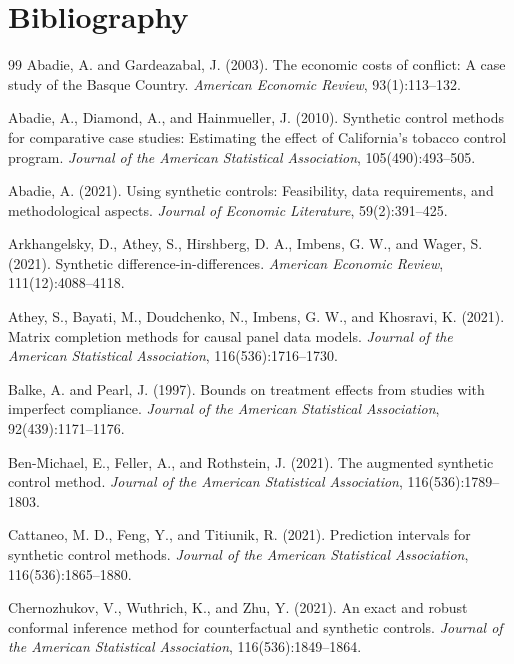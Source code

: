 \documentclass[11pt]{article}
\theoremstyle{definition}
\theoremstyle{plain}
\theoremstyle{remark}
\begin{document}
\section*{Bibliography}
\begin{thebibliography}{99}
Abadie, A. and Gardeazabal, J. (2003).
The economic costs of conflict: A case study of the Basque Country.
\emph{American Economic Review}, 93(1):113--132.

Abadie, A., Diamond, A., and Hainmueller, J. (2010).
Synthetic control methods for comparative case studies: Estimating the effect of California's tobacco control program.
\emph{Journal of the American Statistical Association}, 105(490):493--505.

Abadie, A. (2021).
Using synthetic controls: Feasibility, data requirements, and methodological aspects.
\emph{Journal of Economic Literature}, 59(2):391--425.

Arkhangelsky, D., Athey, S., Hirshberg, D. A., Imbens, G. W., and Wager, S. (2021).
Synthetic difference-in-differences.
\emph{American Economic Review}, 111(12):4088--4118.

Athey, S., Bayati, M., Doudchenko, N., Imbens, G. W., and Khosravi, K. (2021).
Matrix completion methods for causal panel data models.
\emph{Journal of the American Statistical Association}, 116(536):1716--1730.

Balke, A. and Pearl, J. (1997).
Bounds on treatment effects from studies with imperfect compliance.
\emph{Journal of the American Statistical Association}, 92(439):1171--1176.

Ben-Michael, E., Feller, A., and Rothstein, J. (2021).
The augmented synthetic control method.
\emph{Journal of the American Statistical Association}, 116(536):1789--1803.

Cattaneo, M. D., Feng, Y., and Titiunik, R. (2021).
Prediction intervals for synthetic control methods.
\emph{Journal of the American Statistical Association}, 116(536):1865--1880.

Chernozhukov, V., Wuthrich, K., and Zhu, Y. (2021).
An exact and robust conformal inference method for counterfactual and synthetic controls.
\emph{Journal of the American Statistical Association}, 116(536):1849--1864.


\end{thebibliography}
\end{document}
